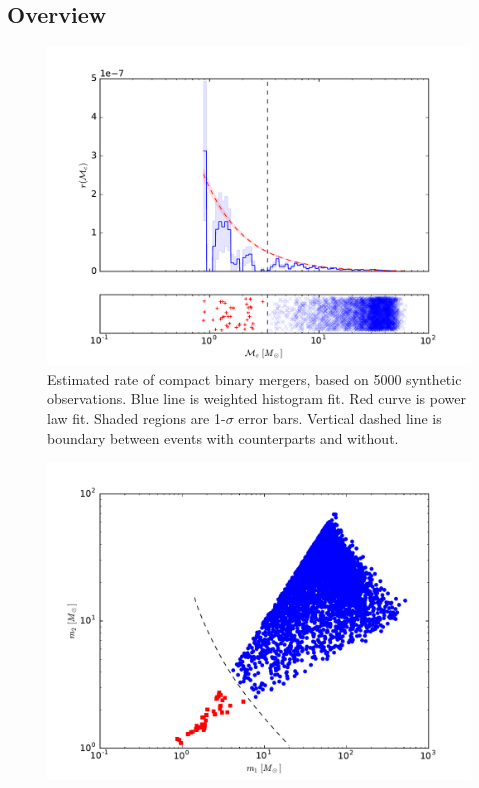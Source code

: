 \subsection{Overview}

\begin{figure}[ht]
  \includegraphics[width=\columnwidth]{img/chirp-mass-distribution}
  \caption{Estimated rate of compact binary mergers, based on 5000 synthetic observations. Blue line is weighted histogram fit. Red curve is power law fit. Shaded regions are 1-$\sigma$ error bars. Vertical dashed line is boundary between events with counterparts and without.}
  \label{fig:chirp}
\end{figure}

\begin{figure}[ht]
  \includegraphics[width=\columnwidth]{img/output/mass-distribution}
  \caption{}
  \label{fig:2D}
\end{figure}

